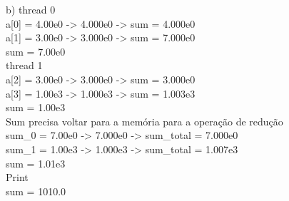 b)
thread 0\\
a[0] = 4.00e0 -> 4.000e0 -> sum = 4.000e0\\
a[1] = 3.00e0 -> 3.000e0 -> sum = 7.000e0\\
sum = 7.00e0\\

thread 1\\
a[2] = 3.00e0 -> 3.000e0 -> sum = 3.000e0\\
a[3] = 1.00e3 -> 1.000e3 -> sum = 1.003e3\\
sum = 1.00e3\\

Sum precisa voltar para a memória para a operação de redução\\

sum\_0 = 7.00e0 -> 7.000e0 -> sum\_total = 7.000e0\\
sum\_1 = 1.00e3 -> 1.000e3 -> sum\_total = 1.007e3\\
sum = 1.01e3\\

Print \\
sum = 1010.0\\


